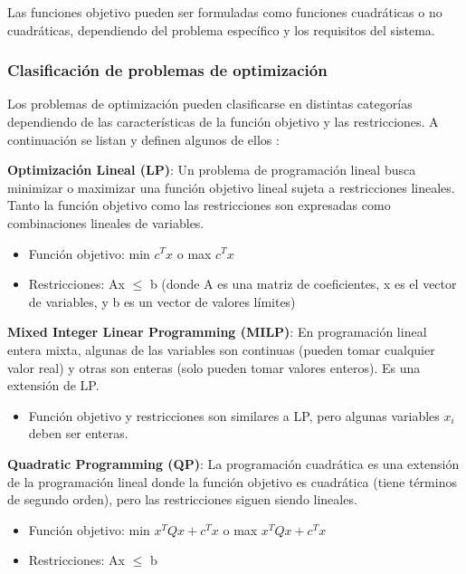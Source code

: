 Las funciones objetivo pueden ser formuladas como funciones cuadráticas o no cuadráticas, dependiendo del problema específico y los requisitos del sistema.

\subsubsection{Clasificación de problemas de optimización}

Los problemas de optimización pueden clasificarse en distintas categorías dependiendo de las características de la función objetivo y las restricciones. A continuación se listan y definen algunos de ellos \cite{ref46}:

\textbf{Optimización Lineal (LP)}: Un problema de programación lineal busca minimizar o maximizar una función objetivo lineal sujeta a restricciones lineales. Tanto la función objetivo como las restricciones son expresadas como combinaciones lineales de variables.

\begin{itemize}
	\item Función objetivo: min $c^Tx$ o max $c^Tx$
	\item Restricciones: Ax $\leq$ b (donde A es una matriz de coeficientes, x es el vector de variables, y b es un vector de valores límites)
\end{itemize}
	
\textbf{Mixed Integer Linear Programming (MILP)}: En programación lineal entera mixta, algunas de las variables son continuas (pueden tomar cualquier valor real) y otras son enteras (solo pueden tomar valores enteros). Es una extensión de LP.

\begin{itemize}
	\item Función objetivo y restricciones son similares a LP, pero algunas variables $x_i$ deben ser enteras.
\end{itemize}


\textbf{Quadratic Programming (QP)}: La programación cuadrática es una extensión de la programación lineal donde la función objetivo es cuadrática (tiene términos de segundo orden), pero las restricciones siguen siendo lineales.

\begin{itemize}
	\item Función objetivo: min $x^TQx + c^Tx$ o max $x^TQx + c^Tx$
	\item Restricciones: Ax $\leq$ b
\end{itemize}


